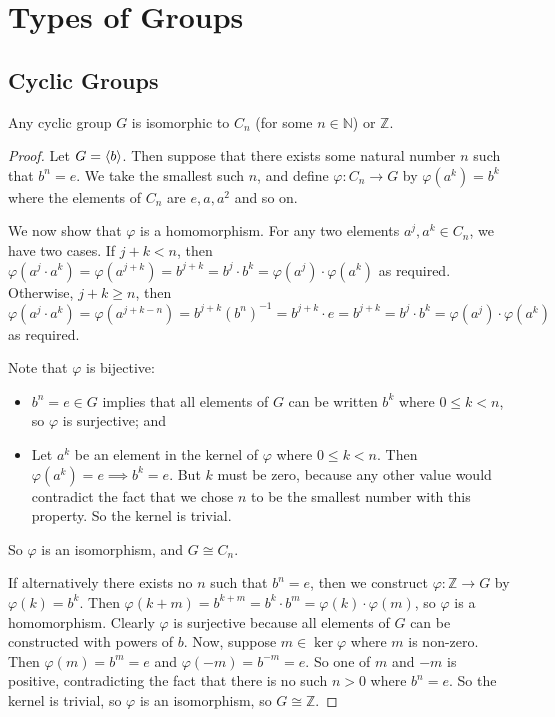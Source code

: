 \documentclass{article}
\begin{document}
	\section{Types of Groups}
	\subsection{Cyclic Groups}
	\begin{theorem}
		Any cyclic group $G$ is isomorphic to $C_n$ (for some $n \in \mathbb N$) or $\mathbb Z$.
	\end{theorem}
	\begin{proof}
		Let $G = \langle b \rangle$. Then suppose that there exists some natural number $n$ such that $b^n = e$. We take the smallest such $n$, and define $\varphi: C_n \to G$ by $\varphi(a^k) = b^k$ where the elements of $C_n$ are $e, a, a^2$ and so on.
		
		We now show that $\varphi$ is a homomorphism. For any two elements $a^j, a^k \in C_n$, we have two cases. If $j + k < n$, then $\varphi(a^j \cdot a^k) = \varphi(a^{j+k}) = b^{j+k} = b^j \cdot b^k = \varphi(a^j) \cdot \varphi(a^k)$ as required. Otherwise, $j + k \geq n$, then $\varphi(a^j \cdot a^k) = \varphi(a^{j+k-n}) = b^{j+k}(b^n)^{-1} = b^{j+k}\cdot e = b^{j+k} = b^j \cdot b^k = \varphi(a^j) \cdot \varphi(a^k)$ as required.
		
		Note that $\varphi$ is bijective:
		\begin{itemize}
			\item $b^n = e \in G$ implies that all elements of $G$ can be written $b^k$ where $0 \leq k < n$, so $\varphi$ is surjective; and
			\item Let $a^k$ be an element in the kernel of $\varphi$ where $0 \leq k < n$. Then $\varphi(a^k) = e \implies b^k = e$. But $k$ must be zero, because any other value would contradict the fact that we chose $n$ to be the smallest number with this property. So the kernel is trivial.
		\end{itemize}
		So $\varphi$ is an isomorphism, and $G \cong C_n$.
		
		If alternatively there exists no $n$ such that $b^n = e$, then we construct $\varphi: \mathbb Z \to G$ by $\varphi(k) = b^k$. Then $\varphi(k + m) = b^{k+m} = b^k \cdot b^m = \varphi(k) \cdot \varphi(m)$, so $\varphi$ is a homomorphism. Clearly $\varphi$ is surjective because all elements of $G$ can be constructed with powers of $b$. Now, suppose $m \in \ker \varphi$ where $m$ is non-zero. Then $\varphi(m) = b^m = e$ and $\varphi(-m) = b^{-m} = e$. So one of $m$ and $-m$ is positive, contradicting the fact that there is no such $n>0$ where $b^n = e$. So the kernel is trivial, so $\varphi$ is an isomorphism, so $G \cong \mathbb Z$.
	\end{proof}
\end{document}
